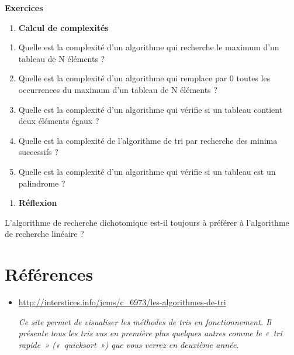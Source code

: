 {\sffamily\bfseries\upshape
Exercices}

\liststyleExercice
\begin{enumerate}
\item {\sffamily\bfseries
Calcul de complexités}
\end{enumerate}
\liststyleNumberingv
\begin{enumerate}
\item {
Quelle est la complexité d'un algorithme qui recherche
le maximum d'un tableau de N éléments ?}
\item {
Quelle est la complexité d'un algorithme qui remplace
par 0 toutes les occurrences du maximum d'un tableau
de N éléments ?}
\item {
Quelle est la complexité d'un algorithme qui vérifie si
un tableau contient deux éléments égaux ?}
\item {
Quelle est la complexité de l'algorithme de tri par
recherche des minima successifs ?}
\item {
Quelle est la complexité d'un algorithme qui vérifie si
un tableau est un palindrome ?}
\end{enumerate}
\liststyleExercice
\begin{enumerate}
\item {\sffamily\bfseries
Réflexion}
\end{enumerate}
{
L’algorithme de recherche dichotomique est-il toujours à préférer à
l’algorithme de recherche linéaire ?}

\section{Références}
\liststyleListv
\begin{itemize}
\item {
\url{http://interstices.info/jcms/c_6973/les-algorithmes-de-tri}

\textit{Ce site permet de visualiser les méthodes de tris en
fonctionnement. Il présente tous les tris vus en première plus quelques
autres comme le «~tri rapide~» («~quicksort~») que vous verrez en
deuxième année. }}
\end{itemize}
